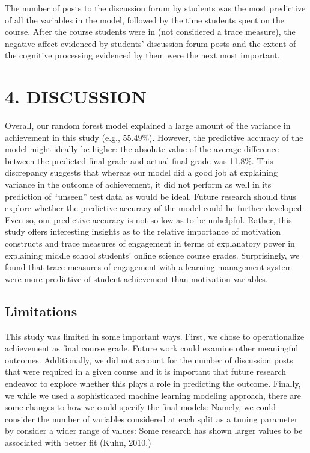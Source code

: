 \documentclass[acmart]{apa6}
\theoremstyle{definition}
\theoremstyle{definition}
\theoremstyle{definition}
\theoremstyle{remark}
\begin{document}
The number of posts to the discussion forum by students was the most
predictive of all the variables in the model, followed by the time
students spent on the course. After the course students were in (not
considered a trace measure), the negative affect evidenced by students'
discussion forum posts and the extent of the cognitive processing
evidenced by them were the next most important.

\section{4. DISCUSSION}\label{discussion}

Overall, our random forest model explained a large amount of the
variance in achievement in this study (e.g., 55.49\%). However, the
predictive accuracy of the model might ideally be higher: the absolute
value of the average difference between the predicted final grade and
actual final grade was 11.8\%. This discrepancy suggests that whereas
our model did a good job at explaining variance in the outcome of
achievement, it did not perform as well in its prediction of
\enquote{unseen} test data as would be ideal. Future research should
thus explore whether the predictive accuracy of the model could be
further developed. Even so, our predictive accuracy is not so low as to
be unhelpful. Rather, this study offers interesting insights as to the
relative importance of motivation constructs and trace measures of
engagement in terms of explanatory power in explaining middle school
students' online science course grades. Surprisingly, we found that
trace measures of engagement with a learning management system were more
predictive of student achievement than motivation variables.

\subsection{Limitations}\label{limitations}

This study was limited in some important ways. First, we chose to
operationalize achievement as final course grade. Future work could
examine other meaningful outcomes. Additionally, we did not account for
the number of discussion posts that were required in a given course and
it is important that future research endeavor to explore whether this
plays a role in predicting the outcome. Finally, we while we used a
sophisticated machine learning modeling approach, there are some changes
to how we could specify the final models: Namely, we could consider the
number of variables considered at each split as a tuning parameter by
consider a wider range of values: Some research has shown larger values
to be associated with better fit (Kuhn, 2010.)
\end{document}
